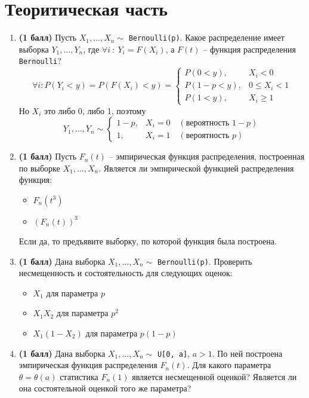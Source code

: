 \documentclass{assignment}
\begin{document}

\section*{Теоритическая часть}
\begin{enumerate}
    \item \textbf{(1 балл)} Пусть $X_1, \ldots, X_n \sim $ \texttt{Bernoulli(p)}. Какое распределение имеет выборка $Y_1, \ldots, Y_n$, где $\forall i~:~Y_i = F(X_i)$, а $F(t)$ -- функция распределения \texttt{Bernoulli}?
    \start
    \begin{equation}
        \forall i : P(Y_i < y) = P(F(X_i) < y) = \begin{cases}
            P(0 < y),& X_i < 0 \\
            P(1 - p < y),& 0 \leq X_i < 1 \\
            P(1 < y),& X_i \geq 1
        \end{cases}
    \end{equation}
    Но $X_i$ это либо 0, либо 1, поэтому
    \begin{equation}
        Y_1, \ldots, Y_n \sim \begin{cases}
            1 - p,& X_i = 0 \quad (\text{вероятность } 1-p) \\
            1,& X_i = 1 \quad (\text{вероятность } p)
        \end{cases}
    \end{equation}
    \finish

    \item \textbf{(1 балл)} Пусть $F_n(t)$ -- эмпирическая функция распределения, построенная по выборке $X_1, \ldots, X_n$. Является ли эмпирической функцией распределения функция:
    \begin{itemize}
        \item $F_n(t^3)$
        \item $(F_n(t))^3$
    \end{itemize}
    Если да, то предъявите выборку, по которой функция была построена.

    \item \textbf{(1 балл)} Дана выборка $X_1, \ldots, X_n \sim $ \texttt{Bernoulli(p)}. Проверить несмещенность и состоятельность для следующих оценок:
    \begin{itemize}
        \item $X_1$ для параметра $p$
        \item $X_1X_2$ для параметра $p^2$
        \item $X_1(1 - X_2)$ для параметра $p(1 - p)$
    \end{itemize}

    \item \textbf{(1 балл)} Дана выборка $X_1, \ldots, X_n \sim $ \texttt{U[0, a]}, $a > 1$. По ней построена эмпирическая функция распределения $F_n(t)$. Для какого параметра $\theta = \theta(a)$ статистика $F_n(1)$ является несмещенной оценкой? Является ли она состоятельной оценкой того же параметра?
\end{enumerate}
\end{document}
